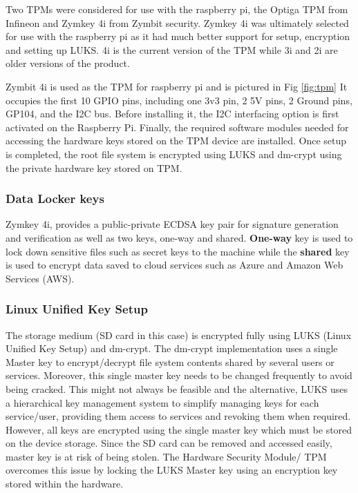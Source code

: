 \documentclass[11pt,openright]{report}
\begin{document}
Two TPMs were considered for use with the raspberry pi, the Optiga TPM from Infineon and Zymkey 4i from Zymbit security. Zymkey 4i was ultimately selected for use with the raspberry pi as it had much better support for setup, encryption and setting up LUKS. 4i is the current version of the TPM while 3i and 2i are older versions of the product.

Zymbit 4i is used as the TPM for raspberry pi and is pictured in Fig \ref{fig:tpm}  It occupies the first 10 GPIO pins, including one 3v3 pin, 2 5V pins, 2 Ground pins, GP104, and the I2C bus. Before installing it, the I2C interfacing option is first activated on the Raspberry Pi. Finally, the required software modules needed for accessing the hardware keys stored on the TPM device are installed. Once setup is completed, the root file system is encrypted using LUKS and dm-crypt using the private hardware key stored on TPM.

\subsubsection{Data Locker keys}
Zymkey 4i, provides a public-private ECDSA key pair for signature generation and verification as well as two keys, one-way and shared. \textbf{One-way} key is used to lock down sensitive files such as secret keys to the machine while the \textbf{shared} key is used to encrypt data saved to cloud services such as Azure and Amazon Web Services (AWS). 

\subsubsection{Linux Unified Key Setup}
The storage medium (SD card in this case) is encrypted fully using LUKS \cite{cryptoeprint:2016:274} (Linux Unified Key Setup) and dm-crypt. The dm-crypt implementation uses a single Master key to encrypt/decrypt file system contents shared by several users or services. Moreover, this single master key needs to be changed frequently to avoid being cracked. This might not always be feasible and the alternative, LUKS uses a hierarchical key management system to simplify managing keys for each service/user, providing them access to services and revoking them when required. However, all keys are encrypted using the single master key which must be stored on the device storage. Since the SD card can be removed and accessed easily, master key is at risk of being stolen. The Hardware Security Module/ TPM overcomes this issue by locking the LUKS Master key using an encryption key stored within the hardware.
\end{document}
